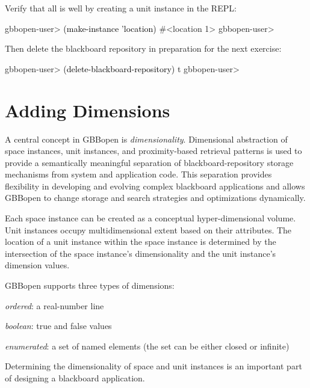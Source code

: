 \documentclass[10pt,twoside,english,pdftex]{article}
\begin{document}
Verify that all is well by creating a  unit instance in
the REPL:
%
\W\supp
\begin{example}
\textcolor{darkergray}{%
  gbbopen-user> \textcolor{black}{(make-instance 'location)}
  #<location 1>
  gbbopen-user>}
\end{example}

%
Then delete the blackboard repository in preparation for the next exercise:
%
\W\supp
\begin{example}
\textcolor{darkergray}{%
  gbbopen-user> \textcolor{black}{(delete-blackboard-repository)}
  t
  gbbopen-user>}
\end{example}


\T\markright{}%
\T\pagestyle{plain}
\T\cleardoublepage
\W{}
\T\pagestyle{fancy}
\T\thispagestyle{fancybottom}
\T\renewcommand{\headrulewidth}{0pt}
\section{Adding Dimensions}
\label{sec:dimensions}%

A central concept in GBBopen is \textit{dimensionality}.  Dimensional
abstraction of space instances, unit instances, and proximity-based
retrieval patterns is used to provide a semantically meaningful
separation of blackboard-repository storage mechanisms from system and
application code.  This separation provides flexibility in developing
and evolving complex blackboard applications and allows GBBopen to
change storage and search strategies and optimizations dynamically.

Each space instance can be created as a conceptual hyper-dimensional
volume.  Unit instances occupy multidimensional extent based on their
attributes.  The location of a unit instance within the space instance
is determined by the intersection of the space instance's
dimensionality and the unit instance's dimension values.

GBBopen supports three types of dimensions:
\begin{tightitemize}
\item \textit{ordered}: a real-number line
\item \textit{boolean}: true and false values
\item \textit{enumerated}: a set of named elements (the set can be
  either closed or infinite)
\end{tightitemize}
Determining the dimensionality of space and unit instances is an
important part of designing a blackboard application.
\end{document}
